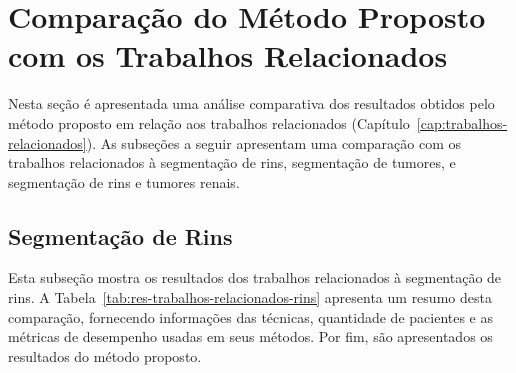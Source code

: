 
\section{Comparação do Método Proposto com os Trabalhos Relacionados}
\label{sec:comparacao}

Nesta seção é apresentada uma análise comparativa dos resultados obtidos pelo método proposto em relação aos trabalhos relacionados (Capítulo~\ref{cap:trabalhos-relacionados}). As subseções a seguir apresentam uma comparação com os trabalhos relacionados à segmentação de rins, segmentação de tumores, e segmentação de rins e tumores renais.

\subsection{Segmentação de Rins}
\label{sec:disc-trab-relac-rins}

Esta subseção mostra os resultados dos trabalhos relacionados à segmentação de rins. A Tabela~\ref{tab:res-trabalhos-relacionados-rins} apresenta um resumo desta comparação, fornecendo informações das técnicas, quantidade de pacientes e as métricas de desempenho usadas em seus métodos. Por fim, são apresentados os resultados do método proposto. 

